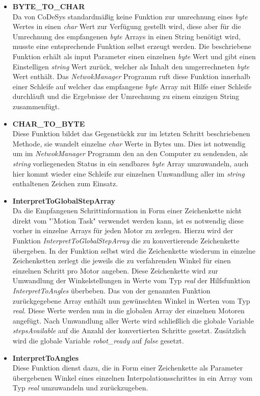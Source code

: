 \begin{itemize}
\item \textbf{BYTE\_TO\_CHAR}\\
Da von CoDeSys standardmäßig keine Funktion zur umrechnung eines \textit{byte} Wertes in einen \textit{char} Wert zur Verfügung gestellt wird, diese aber für die Umrechnung des empfangenen \textit{byte} Arrays in einen String benötigt wird, musste eine entsprechende Funktion selbst erzeugt werden. Die beschriebene Funktion erhält als input Parameter einen einzelnen \textit{byte} Wert und gibt einen Einstelligen \textit{string} Wert zurück, welcher als Inhalt den umgerrechneten \textit{byte} Wert enthält. Das \textit{NetwokManager} Programm ruft diese Funktion innerhalb einer Schleife auf welcher das empfangene \textit{byte} Array mit Hilfe einer Schleife durchläuft und die Ergebnisse der Umrechnung zu einem einzigen String zusammenfügt.

\item \textbf{CHAR\_TO\_BYTE}\\
Diese Funktion bildet das Gegenstückk zur im letzten Schritt beschriebenen Methode, sie wandelt einzelne \textit{char} Werte in Bytes um. Dies ist notwendig um im \textit{NetwokManager} Programm den an den Computer zu sendenden, als \textit{string} vorliegeneden Status  in ein sendbares \textit{byte} Array umzuwandeln, auch hier kommt wieder eine Schleife zur einzelnen Umwandlung aller im \textit{string} enthaltenen Zeichen zum Einsatz.

\item \textbf{InterpretToGlobalStepArray}\\
Da die Empfangenen Schrittinformation in Form einer Zeichenkette nicht direkt vom "'Motion Task" verwendet werden kann, ist es notwendig diese vorher in einzelne Arrays für jeden Motor zu zerlegen. Hierzu wird der Funktion \textit{InterpretToGlobalStepArray} die zu konvertierende Zeichenkette übergeben. In der Funktion selbst wird die Zeichenkette wiederum in einzelne Zeichenketten zerlegt die jeweils die zu verfahrenden Winkel für einen einzelnen Schritt pro Motor angeben. Diese Zeichenkette wird zur Umwandlung der Winkelstellungen in Werte vom Typ \textit{real} der Hilfsfunktion \textit{InterpretToAngles} überbeben. Das von der genannten Funktion zurückgegebene Array enthält nun gewünschten Winkel in Werten vom Typ \textit{real}. Diese Werte werden nun in die globalen Array der einzelnen Motoren angefügt. Nach Umwandlung aller Werte wird schließlich die globale Variable \textit{stepsAvailable} auf die Anzahl der konvertierten Schritte gesetzt. Zusätzlich wird die globale Variable \textit{robot\_ready} auf \textit{false} gesetzt.

\item \textbf{InterpretToAngles}\\
Diese Funktion dienst dazu, die in Form einer Zeichenkette als Parameter übergebenen Winkel eines einzelnen Interpolationsschrittes in ein Array vom Typ \textit{real} umzuwandeln und zurückzugeben.

\end{itemize}

